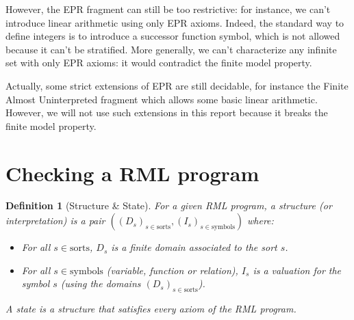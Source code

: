 \documentclass[11pt,a4paper,oldfontcommands,openany]{memoir}
\newtheorem*{definition}{Definition}
\begin{document}
        However, the EPR fragment can still be too restrictive: for instance, we can't introduce linear arithmetic using only EPR axioms.
        Indeed, the standard way to define integers is to introduce a successor function symbol, which is not allowed because it can't be stratified.
        More generally, we can't characterize any infinite set with only EPR axioms: it would contradict the finite model property.

        Actually, some strict extensions of EPR are still decidable, for instance the Finite Almost Uninterpreted fragment\cite{Taube:2018:MDD:3192366.3192414} which allows
        some basic linear arithmetic. However, we will not use such extensions in this report because it breaks the finite model property.


    
    \section{Checking a RML program}

    \begin{definition}[Structure \& State]
        For a given RML program, a structure (or interpretation) is a pair \(((D_s)_{s\in \text{sorts}}, (I_s)_{s\in \text{symbols}})\) where:
        \begin{itemize}
            \item For all \(s \in \text{sorts}\), \(D_s\) is a finite domain associated to the sort \(s\).
            \item For all \(s \in \text{symbols}\) (variable, function or relation), \(I_s\) is a valuation for the symbol \(s\) (using the domains \((D_s)_{s\in \text{sorts}}\)).
        \end{itemize}
        A state is a structure that satisfies every axiom of the RML program.
    \end{definition}
\end{document}

